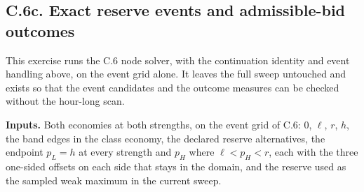 \subsection{C.6c. Exact reserve events and admissible-bid
outcomes}\label{oa-c-reserve-events}

This exercise runs the C.6 node solver, with the continuation identity
and event handling above, on the event grid alone. It leaves the full
sweep untouched and exists so that the event candidates and the outcome
measures can be checked without the hour-long scan.

\textbf{Inputs.} Both economies at both strengths, on the event grid of
C.6: \(0\), \(\ell\), \(r\), \(h\), the band edges in the class economy,
the declared reserve alternatives, the endpoint \(p_L=h\) at every strength and \(p_H\)
where \(\ell<p_H<r\), each with the three one-sided offsets on each
side that stays in the domain, and the reserve
 used as the sampled weak maximum
in the current sweep.

